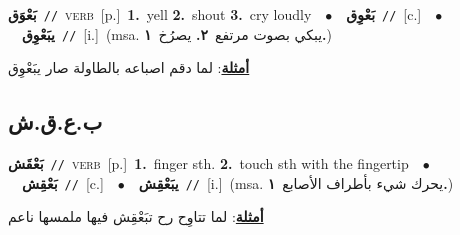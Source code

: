 \documentclass[10pt,a4paper,twoside]{article} %
\begin{document}
\begin{multicols}{2}
{\setlength\topsep{0pt}\textbf{\foreignlanguage{arabic}{بَعْوَق}}\ {\color{gray}\texttt{//}\color{black}}\ \textsc{verb}\ [p.]\ \textbf{1.}~yell  \textbf{2.}~shout  \textbf{3.}~cry loudly\ \ $\bullet$\ \ \setlength\topsep{0pt}\textbf{\foreignlanguage{arabic}{بَعْوِق}}\ {\color{gray}\texttt{//}\color{black}}\ [c.]\ \ $\bullet$\ \ \setlength\topsep{0pt}\textbf{\foreignlanguage{arabic}{يبَعْوِق}}\ {\color{gray}\texttt{//}\color{black}}\ [i.]\ \color{gray}(msa. \foreignlanguage{arabic}{يبكي بصوت مرتفع}~\foreignlanguage{arabic}{\textbf{٢.}}  \foreignlanguage{arabic}{يصرُخ}~\foreignlanguage{arabic}{\textbf{١.}})\color{black}\  \begin{flushright}\color{gray}\foreignlanguage{arabic}{\textbf{\underline{\foreignlanguage{arabic}{أمثلة}}}: لما دقم اصباعه بالطاولة صار يبَعْوِق}\end{flushright}\color{black}} \vspace{2mm}

\vspace{-3mm}
\subsection*{\color{blue}\foreignlanguage{arabic}{ب.ع.ق.ش}\color{blue}{}} 

{\setlength\topsep{0pt}\textbf{\foreignlanguage{arabic}{بَعْقَش}}\ {\color{gray}\texttt{//}\color{black}}\ \textsc{verb}\ [p.]\ \textbf{1.}~finger sth.  \textbf{2.}~touch sth with the fingertip\ \ $\bullet$\ \ \setlength\topsep{0pt}\textbf{\foreignlanguage{arabic}{بَعْقِش}}\ {\color{gray}\texttt{//}\color{black}}\ [c.]\ \ $\bullet$\ \ \setlength\topsep{0pt}\textbf{\foreignlanguage{arabic}{يبَعْقِش}}\ {\color{gray}\texttt{//}\color{black}}\ [i.]\ \color{gray}(msa. \foreignlanguage{arabic}{يحرك شيء بأطراف الأصابع}~\foreignlanguage{arabic}{\textbf{١.}})\color{black}\  \begin{flushright}\color{gray}\foreignlanguage{arabic}{\textbf{\underline{\foreignlanguage{arabic}{أمثلة}}}: لما تتاوِح رح تبَعْقِش فيها ملمسها ناعم}\end{flushright}\color{black}} \vspace{2mm}


\end{multicols}
\end{document}

